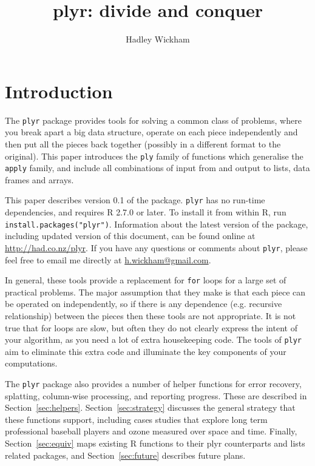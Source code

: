 \documentclass[letterpaper,oneside]{scrartcl}
\title{plyr: divide and conquer}
\author{Hadley Wickham}
\begin{document}
\maketitle


\section{Introduction}

The {\tt plyr} package provides tools for solving a common class of problems, where you break apart a big data structure, operate on each piece independently and then put all the pieces back together (possibly in a different format to the original).  This paper introduces the {\tt ply} family of functions which generalise the {\tt apply} family, and include all combinations of input from and output to lists, data frames and arrays.

This paper describes version 0.1 of the package.  {\tt plyr} has no run-time dependencies, and requires R 2.7.0 or later.  To install it from within R, run {\tt install.packages("plyr")}.  Information about the latest version of the package, including updated version of this document, can be found online at  \url{http://had.co.nz/plyr}.  If you have any questions or comments about {\tt plyr}, please feel free to email me directly at \href{mailto:h.wickham@gmail.com}{h.wickham@gmail.com}.

In general, these tools provide a replacement for {\tt for} loops for a large set of practical problems.  The major assumption that they make is that each piece can be operated on independently, so if there is any dependence (e.g. recursive relationship) between the pieces then these tools are not appropriate.  It is not true that for loops are slow, but often they do not clearly express the intent of your algorithm, as you need a lot of extra housekeeping code. The tools of {\tt plyr} aim to eliminate this extra code and illuminate the key components of your computations.

 The {\tt plyr} package also provides a number of helper functions for error recovery, splatting, column-wise processing, and reporting progress. These are described in Section~\ref{sec:helpers}. Section~\ref{sec:strategy} discusses the general strategy that these functions support, including cases studies that explore long term professional baseball players and ozone measured over space and time.  Finally, Section~\ref{sec:equiv} maps existing R functions to their plyr counterparts and lists related packages, and Section~\ref{sec:future} describes future plans.
\end{document}
